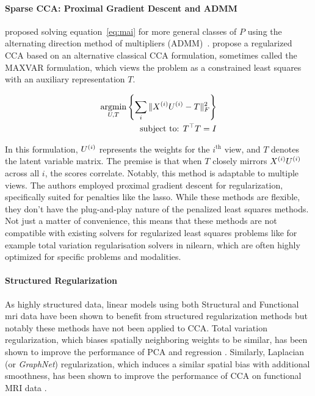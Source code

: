 \paragraph{Sparse CCA: Proximal Gradient Descent and ADMM}
\citet{kanatsoulis2018structured} proposed solving equation~\ref{eq:mai} for more general classes of $P$ using the alternating direction method of multipliers (ADMM)~\citep{boyd2011distributed}.
\cite{fu2017scalable} propose a regularized CCA based on an alternative classical CCA formulation, sometimes called the MAXVAR formulation, which views the problem as a constrained least squares with an auxiliary representation $T$\citep{carroll1968generalization,kettenring1971canonical}.

\begin{align}
    \label{eq:fu}
    \underset{U, T}{\mathrm{argmin}}\left\{\sum_i \|X^{(i)} U^{(i)} - T\|_F^2\right\}\\
    \text{subject to: }T^\top T = I\\
\end{align}

In this formulation, \(U^{(i)}\) represents the \gls{weights} for the $i^{\text{th}}$ view, and \(T\) denotes the latent variable matrix.
The premise is that when \(T\) closely mirrors \(X^{(i)} U^{(i)}\) across all \(i\), the scores correlate.
Notably, this method is adaptable to multiple views.
The authors employed proximal gradient descent for regularization, specifically suited for penalties like the lasso.
While these methods are flexible, they don't have the plug-and-play nature of the penalized least squares methods.
Not just a matter of convenience, this means that these methods are not compatible with existing solvers for regularized least squares problems like for example total variation regularisation solvers in nilearn, which are often highly optimized for specific problems and modalities.

\paragraph{Structured Regularization}

As highly structured data, linear models using both Structural and Functional \acrshort{mri} data have been shown to benefit from structured regularization methods but notably these methods have not been applied to CCA.
Total variation regularization, which biases spatially neighboring weights to be similar, has been shown to improve the performance of PCA \citep{de2017structured} and regression \citep{michel2011total,dohmatob2014benchmarking, baldassarre2012structured}.
Similarly, Laplacian (or \textit{GraphNet}) regularization, which induces a similar spatial bias with additional smoothness, has been shown to improve the performance of CCA on functional MRI data \citep{grosenick2013interpretable}.

